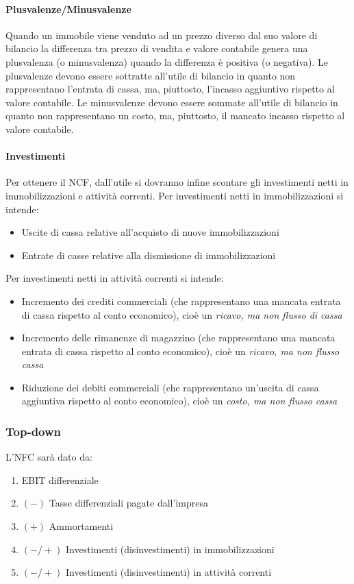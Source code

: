 \paragraph{Plusvalenze/Minusvalenze} Quando un immobile viene venduto ad un prezzo diverso dal suo valore di bilancio la differenza tra
prezzo di vendita e valore contabile genera una plusvalenza (o minusvalenza) quando la differenza è
positiva (o negativa). Le plusvalenze devono essere sottratte all’utile di bilancio in quanto non rappresentano l’entrata di cassa,
ma, piuttosto, l’incasso aggiuntivo rispetto al valore contabile. Le minusvalenze devono essere sommate all’utile di bilancio in quanto non rappresentano un costo, ma,
piuttosto, il mancato incasso rispetto al valore contabile.

\paragraph{Investimenti} Per ottenere il NCF, dall’utile si dovranno infine scontare gli investimenti netti in immobilizzazioni e
attività correnti. Per investimenti netti in immobilizzazioni si intende:
\begin{itemize}
    \item Uscite di cassa relative all’acquisto di nuove immobilizzazioni
    \item Entrate di casse relative alla dismissione di immobilizzazioni
\end{itemize}
Per investimenti netti in attività correnti si intende:
\begin{itemize}
    \item Incremento dei crediti commerciali (che rappresentano una mancata entrata di cassa rispetto al
    conto economico), cioè un \emph{ricavo, ma non flusso di cassa}
    \item Incremento delle rimanenze di magazzino (che rappresentano una mancata entrata di cassa
    rispetto al conto economico), cioè un \emph{ricavo, ma non flusso cassa}
    \item Riduzione dei debiti commerciali (che rappresentano un’uscita di cassa aggiuntiva rispetto al
    conto economico), cioè un \emph{costo, ma non flusso cassa}
\end{itemize}

\subsubsection{Top-down}
L'NFC sarà dato da:
\begin{enumerate}
    \item EBIT differenziale
    \item $(-)$ Tasse differenziali pagate dall’impresa
    \item $(+)$ Ammortamenti
    \item $(-/+)$ Investimenti (disinvestimenti) in immobilizzazioni
    \item $(-/+)$ Investimenti (disinvestimenti) in attività correnti 
\end{enumerate}
